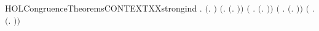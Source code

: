 \newcommand{\HOLCongruenceTheoremsCONTEXTXXrules}{\UseVerbatim{HOLCongruenceTheoremsCONTEXTXXrules}}
\begin{SaveVerbatim}{HOLCongruenceTheoremsCONTEXTXXstrongind}
\HOLTokenTurnstile{} \HOLSymConst{\HOLTokenForall{}}.
        \ensuremath{(}\HOLTokenLambda{}. \ensuremath{)} \HOLSymConst{\HOLTokenConj{}} \ensuremath{(}\HOLSymConst{\HOLTokenForall{}}.  \ensuremath{(}\HOLTokenLambda{}. \ensuremath{)}\ensuremath{)} \HOLSymConst{\HOLTokenConj{}}
       \ensuremath{(}\HOLSymConst{\HOLTokenForall{}} .   \HOLSymConst{\HOLTokenConj{}}   \HOLSymConst{\HOLTokenImp{}}  \ensuremath{(}\HOLTokenLambda{}. \HOLSymConst{\ensuremath{\ldotp}} \ensuremath{)}\ensuremath{)} \HOLSymConst{\HOLTokenConj{}}
       \ensuremath{(}\HOLSymConst{\HOLTokenForall{}} .
              \HOLSymConst{\HOLTokenConj{}}   \HOLSymConst{\HOLTokenConj{}}   \HOLSymConst{\HOLTokenConj{}}   \HOLSymConst{\HOLTokenImp{}}
             \ensuremath{(}\HOLTokenLambda{}.   \HOLSymConst{\ensuremath{+}}  \ensuremath{)}\ensuremath{)} \HOLSymConst{\HOLTokenConj{}}
       \ensuremath{(}\HOLSymConst{\HOLTokenForall{}} .
              \HOLSymConst{\HOLTokenConj{}}   \HOLSymConst{\HOLTokenConj{}}   \HOLSymConst{\HOLTokenConj{}}   \HOLSymConst{\HOLTokenImp{}}
             \ensuremath{(}\HOLTokenLambda{}.   \HOLSymConst{\ensuremath{\mid}}  \ensuremath{)}\ensuremath{)} \HOLSymConst{\HOLTokenConj{}}

\end{SaveVerbatim}
